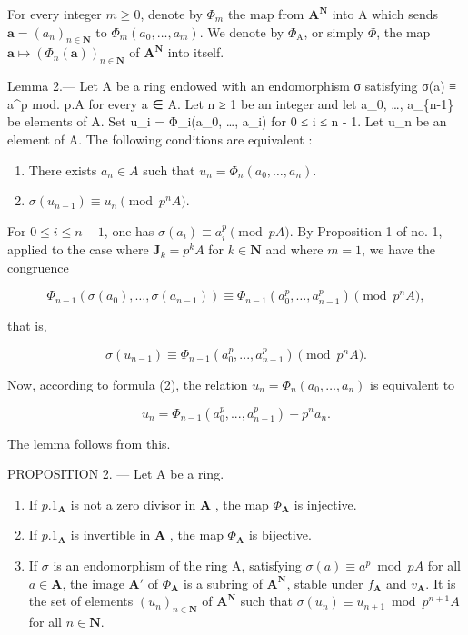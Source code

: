 For every integer \(m \geqslant 0\), denote by \(\Phi_{m}\) the map from \(\mathbf{A}^{\mathbf{N}}\) into A which sends \(\boldsymbol{a} = (a_{n})_{n \in \mathbf{N}}\) to \(\Phi_{m}(a_{0}, \ldots, a_{m})\). We denote by \(\Phi_{\mathrm{A}}\), or simply \(\Phi\), the map \(\boldsymbol{a} \mapsto (\Phi_{n}(\boldsymbol{a}))_{n \in \mathbf{N}}\) of \(\mathbf{A}^{\mathbf{N}}\) into itself.

Lemma 2.--- Let A be a ring endowed with an endomorphism σ satisfying σ(a) ≡ a\^{}p mod. p.A for every a ∈ A. Let n ≥ 1 be an integer and let a\_0, \ldots, a\_\{n-1\} be elements of A. Set u\_i = Φ\_i(a\_0, \ldots, a\_i) for 0 ≤ i ≤ n - 1. Let u\_n be an element of A. The following conditions are equivalent :

\begin{enumerate}
\def\labelenumi{\alph{enumi})}
\item
  There exists \(a_{n} \in A\) such that \(u_{n} = \Phi_{n}(a_{0}, \ldots, a_{n})\).
\item
  \(\sigma(u_{n-1}) \equiv u_n \pmod{p^nA}\).
\end{enumerate}

For \(0 \leqslant i \leqslant n - 1\), one has \(\sigma(a_i) \equiv a_i^p \pmod{pA}\). By Proposition 1 of no. 1, applied to the case where \(\mathbf{J}_k = p^kA\) for \(k \in \mathbf{N}\) and where \(m = 1\), we have the congruence

\[
\Phi_ {n - 1} \left(\sigma \left(a _ {0}\right), \dots , \sigma \left(a _ {n - 1}\right)\right) \equiv \Phi_ {n - 1} \left(a _ {0} ^ {p}, \dots , a _ {n - 1} ^ {p}\right) \pmod{p ^ {n}A},\tag{7}
\]

that is,

\[
\sigma (u _ {n - 1}) \equiv \Phi_ {n - 1} (a _ {0} ^ {p},..., a _ {n - 1} ^ {p}) \pmod{p ^ {n}A}.\tag{8}
\]

Now, according to formula (2), the relation \(u_n = \Phi_n(a_0, \ldots, a_n)\) is equivalent to

\[
u _ {n} = \Phi_ {n - 1} (a _ {0} ^ {p},..., a _ {n - 1} ^ {p}) + p ^ {n} a _ {n}.\tag{9}
\]

The lemma follows from this.

PROPOSITION 2. --- Let A be a ring.

\begin{enumerate}
\def\labelenumi{\alph{enumi})}
\item
  If \(p.1_{\mathbf{A}}\) is not a zero divisor in \(\mathbf{A}\) , the map \(\Phi_{\mathbf{A}}\) is injective.
\item
  If \(p.1_{\mathbf{A}}\) is invertible in \(\mathbf{A}\) , the map \(\Phi_{\mathbf{A}}\) is bijective.
\item
  If \(\sigma\) is an endomorphism of the ring A, satisfying \(\sigma(a) \equiv a^p \bmod pA\) for all \(a \in \mathbf{A}\), the image \(\mathbf{A}'\) of \(\Phi_{\mathbf{A}}\) is a subring of \(\mathbf{A}^{\mathbf{N}}\), stable under \(f_{\mathbf{A}}\) and \(v_{\mathbf{A}}\). It is the set of elements \((u_n)_{n \in \mathbf{N}}\) of \(\mathbf{A}^{\mathbf{N}}\) such that \(\sigma(u_n) \equiv u_{n+1} \bmod p^{n+1}A\) for all \(n \in \mathbf{N}\).
\end{enumerate}

